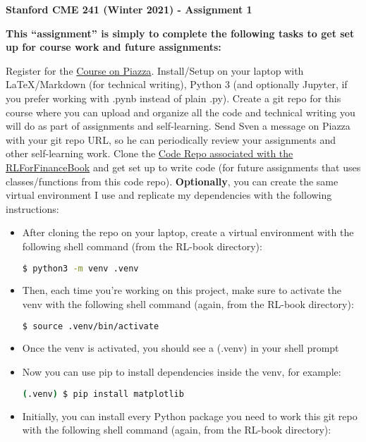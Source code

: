 \documentclass[12pt]{exam}
\begin{document}
\begin{center}
{\large {\bf Stanford CME 241 (Winter 2021) - Assignment 1}}
\end{center}
 
{\large{\bf This ``assignment'' is simply to complete the following tasks to get set up for course work and future assignments:}}
\begin{questions}
\question Register for the \href{https://piazza.com/stanford/winter2021/cme241/home}{Course on Piazza}.
\question Install/Setup on your laptop with LaTeX/Markdown (for technical writing), Python 3 (and optionally Jupyter, if you prefer working with .pynb instead of plain .py).
\question Create a git repo for this course where you can upload and organize all the code and technical writing you will do as part of assignments and self-learning.
\question Send Sven a message on Piazza with your git repo URL, so he can periodically review your assignments and other self-learning work.
\question Clone the \href{https://github.com/TikhonJelvis/RL-book}{Code Repo associated with the RLForFinanceBook} and get set up to write code (for future assignments that uses classes/functions from this code repo). {\bf Optionally}, you can create the same virtual environment I use and replicate my dependencies with the following instructions:
\begin{itemize}
\item After cloning the repo on your laptop, create a virtual environment with the following shell command (from the RL-book directory):
\begin{lstlisting}[language=bash]
$ python3 -m venv .venv
\end{lstlisting}
\item Then, each time you're working on this project, make sure to activate the venv with the following shell command (again, from the RL-book directory):
\begin{lstlisting}[language=bash]
$ source .venv/bin/activate
\end{lstlisting}
\item Once the venv is activated, you should see a (.venv) in your shell prompt
\item Now you can use pip to install dependencies inside the venv, for example:
\begin{lstlisting}[language=bash]
(.venv) $ pip install matplotlib
\end{lstlisting}
\item Initially, you can install every Python package you need to work this git repo with the following shell command (again, from the RL-book directory):

\end{itemize}
\end{questions}
\end{document}
